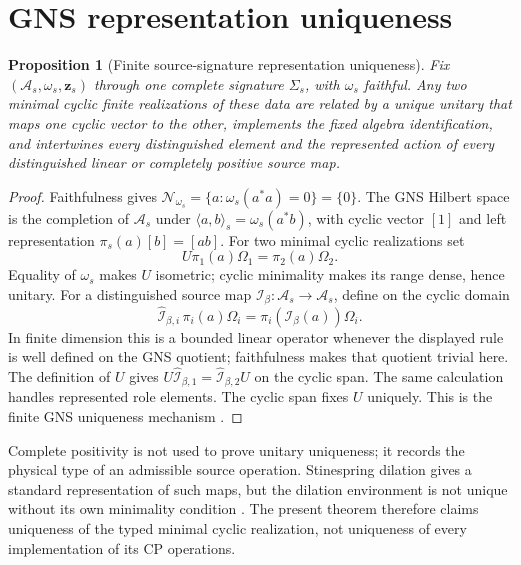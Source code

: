 \documentclass[11pt]{article}
\newtheorem{proposition}{Proposition}
\begin{document}
\section{GNS representation uniqueness}

\begin{proposition}[Finite source-signature representation uniqueness]
Fix \((\mathcal A_s,\omega_s,\mathbf z_s)\) through one complete signature
\(\Sigma_s\), with \(\omega_s\) faithful.  Any two minimal cyclic finite
realizations of these data are related by a unique unitary that maps one cyclic
vector to the other, implements the fixed algebra identification, and
intertwines every distinguished element and the represented action of every
distinguished linear or completely positive source map.
\end{proposition}
\begin{proof}
Faithfulness gives
\(\mathcal N_{\omega_s}=\{a:\omega_s(a^*a)=0\}=\{0\}\).  The GNS Hilbert space
is the completion of \(\mathcal A_s\) under
\(\langle a,b\rangle_s=\omega_s(a^*b)\), with cyclic vector \([1]\) and left
representation \(\pi_s(a)[b]=[ab]\).  For two minimal cyclic realizations set
\begin{equation}
 U\pi_1(a)\Omega_1=\pi_2(a)\Omega_2.
\end{equation}
Equality of \(\omega_s\) makes \(U\) isometric; cyclic minimality makes its
range dense, hence unitary.  For a distinguished source map
\(\mathcal I_\beta:\mathcal A_s\to\mathcal A_s\), define on the cyclic
domain
\begin{equation}
 \widehat{\mathcal I}_{\beta,i}\,\pi_i(a)\Omega_i
 =\pi_i(\mathcal I_\beta(a))\Omega_i.
 \label{eq:represented-source-map}
\end{equation}
In finite dimension this is a bounded linear operator whenever the displayed
rule is well defined on the GNS quotient; faithfulness makes that quotient
trivial here.  The definition of \(U\) gives
\(U\widehat{\mathcal I}_{\beta,1}
=\widehat{\mathcal I}_{\beta,2}U\) on the cyclic span.  The same calculation
handles represented role elements.  The cyclic span fixes \(U\) uniquely.
This is the
finite GNS uniqueness mechanism \cite{Segal1947}.
\end{proof}

Complete positivity is not used to prove unitary uniqueness; it records the
physical type of an admissible source operation.  Stinespring dilation gives a
standard representation of such maps, but the dilation environment is not
unique without its own minimality condition \cite{Stinespring1955}.  The
present theorem therefore claims uniqueness of the typed minimal cyclic
realization, not uniqueness of every implementation of its CP operations.
\end{document}
